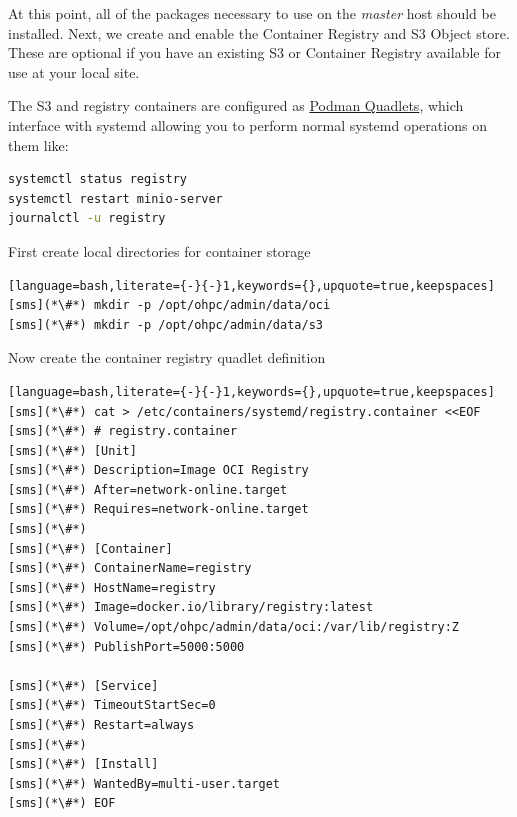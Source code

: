 At this point, all of the packages necessary to use
\OpenCHAMI{} on the {\em master} host should be installed. Next, we create
and enable the Container Registry and S3 Object store.
These are optional if you have an existing S3 or Container Registry available for use at your local site.

\begin{center}
\begin{tcolorbox}[]
\small The S3 and registry containers are configured as \href{https://docs.podman.io/en/latest/markdown/podman-systemd.unit.5.html}{Podman Quadlets},
which interface with systemd allowing you to perform normal systemd operations on them like:
\begin{lstlisting}[language=bash]
systemctl status registry
systemctl restart minio-server
journalctl -u registry
\end{lstlisting}
\end{tcolorbox}
\end{center}

First create local directories for container storage
\begin{lstlisting}[language=bash,literate={-}{-}1,keywords={},upquote=true,keepspaces]
[sms](*\#*) mkdir -p /opt/ohpc/admin/data/oci
[sms](*\#*) mkdir -p /opt/ohpc/admin/data/s3
\end{lstlisting}

Now create the container registry quadlet definition
\begin{lstlisting}[language=bash,literate={-}{-}1,keywords={},upquote=true,keepspaces]
[sms](*\#*) cat > /etc/containers/systemd/registry.container <<EOF
[sms](*\#*) # registry.container
[sms](*\#*) [Unit]
[sms](*\#*) Description=Image OCI Registry
[sms](*\#*) After=network-online.target
[sms](*\#*) Requires=network-online.target
[sms](*\#*)
[sms](*\#*) [Container]
[sms](*\#*) ContainerName=registry
[sms](*\#*) HostName=registry
[sms](*\#*) Image=docker.io/library/registry:latest
[sms](*\#*) Volume=/opt/ohpc/admin/data/oci:/var/lib/registry:Z
[sms](*\#*) PublishPort=5000:5000

[sms](*\#*) [Service]
[sms](*\#*) TimeoutStartSec=0
[sms](*\#*) Restart=always
[sms](*\#*)
[sms](*\#*) [Install]
[sms](*\#*) WantedBy=multi-user.target
[sms](*\#*) EOF
\end{lstlisting}


